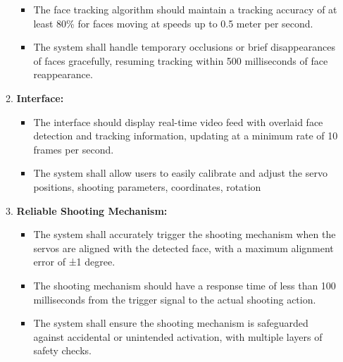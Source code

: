 \documentclass[a4paper,11pt]{article}%
\newenvironment{qanda}{\setlength{\parindent}{0pt}}{\bigskip}
\begin{document}
\begin{qanda}
\begin{enumerate}
\begin{enumerate}
\begin{itemize}
					      \item The face tracking algorithm should maintain a tracking accuracy of at least 80\% for faces moving at speeds up to 0.5 meter per second.
					      \item The system shall handle temporary occlusions or brief disappearances of faces gracefully, resuming tracking within 500 milliseconds of face reappearance.
				      \end{itemize}
				\item \textbf{Interface:}
				      \begin{itemize}
					      \item The interface should display real-time video feed with overlaid face detection and tracking information, updating at a minimum rate of 10 frames per second.
					      \item The system shall allow users to easily calibrate and adjust the servo positions, shooting parameters, coordinates, rotation
				      \end{itemize}
				\item \textbf{Reliable Shooting Mechanism:}
				      \begin{itemize}
					      \item The system shall accurately trigger the shooting mechanism when the servos are aligned with the detected face, with a maximum alignment error of ±1 degree.
					      \item The shooting mechanism should have a response time of less than 100 milliseconds from the trigger signal to the actual shooting action.
					      \item The system shall ensure the shooting mechanism is safeguarded against accidental or unintended activation, with multiple layers of safety checks.
				      \end{itemize}

			\end{enumerate}










	\end{enumerate}


\end{qanda}
\end{document}
